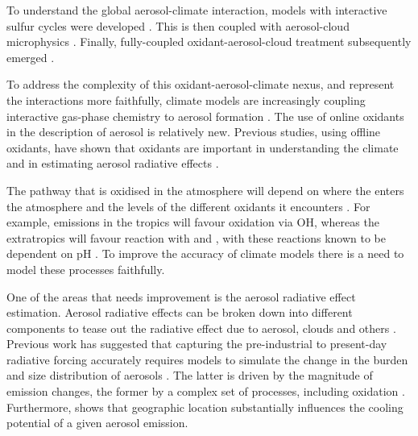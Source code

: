 To understand the global aerosol-climate interaction, models with interactive sulfur cycles were developed \citep{langnerGlobalThreedimensionalModel1991, boucherCloudsAerosols2014}. This is then coupled with aerosol-cloud microphysics \citep[e.g. ][]{feichterSimulationTroposphericSulfur1996}. Finally, fully-coupled oxidant-aerosol-cloud treatment subsequently emerged \citep[e.g. ][]{tegenGlobalAerosolClimate2019, mulcahyUKESM1DevelopmentEvaluation2022}.

To address the complexity of this oxidant-aerosol-climate nexus, and represent the interactions more faithfully, climate models are increasingly coupling interactive gas-phase chemistry to aerosol formation \citep{tegenGlobalAerosolClimate2019, mulcahyDescriptionEvaluationAerosol2020}. The use of online oxidants in the description of aerosol is relatively new. Previous studies, using offline oxidants, have shown that oxidants are important in understanding the climate and in estimating aerosol radiative effects \citep{karsetStrongImpactsAerosol2018}.


The pathway that  is oxidised in the atmosphere will depend on where the  enters the atmosphere and the levels of the different oxidants it encounters \citep{roelofsAnalysisRegionalBudgets2001,yangImpactAnthropogenicEmission2019, wilcoxRegionalAerosolModel2022}. For example, emissions in the tropics will favour oxidation via OH, whereas the extratropics will favour reaction with  and , with these reactions known to be dependent on pH \citep{turnockImpactChangesCloud2019}. To improve the accuracy of climate models there is a need to model these processes faithfully. 


One of the areas that needs improvement is the aerosol radiative effect estimation. 
Aerosol radiative effects can be broken down into different components to tease out the radiative effect due to aerosol, clouds and others \citep{ghanChallengesConstrainingAnthropogenic2016}. Previous work has suggested that capturing the pre-industrial to present-day radiative forcing accurately requires models to simulate the change in the burden and size distribution of aerosols \citep{pilinisSensitivityDirectClimate1995, haywoodEstimatesDirectIndirect2000}. The latter is driven by the magnitude of emission changes, the former by a complex set of processes, including oxidation \citep{karsetStrongImpactsAerosol2018}. Furthermore, \citet{persadDivergentGlobalscaleTemperature2018} shows that geographic location substantially influences the cooling potential of a given aerosol emission. 

